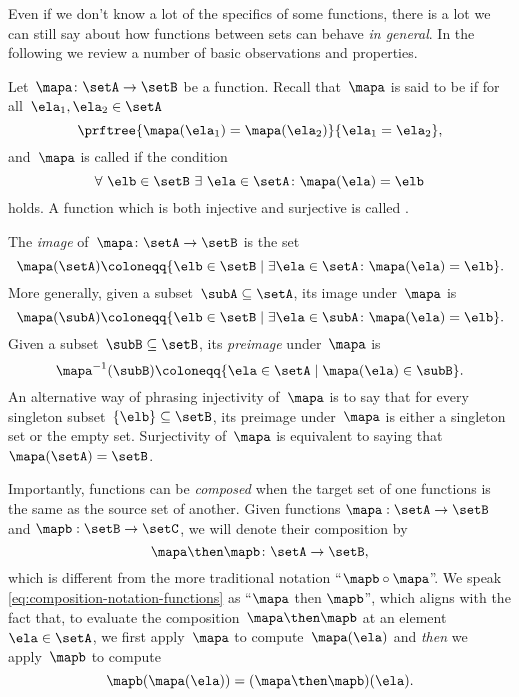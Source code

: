Even if we don't know a lot of the specifics of some functions, there is a lot we can still say about how functions between sets can behave \emph{in general}.
In the following we review a number of basic observations and properties.

Let~$\mapa\colon \setA \to \setB$ be a function.
Recall that~$\mapa$ is said to be \emph{} if for all~$\ela_1, \ela_2 \in \setA$
\begin{equation}
    \label{eq:injectivity-cond}
    \prftree{\mapa(\ela_1) = \mapa(\ela_2)}{\ela_1 = \ela_2},
\end{equation}
and~$\mapa$ is called \emph{} if the condition
\begin{equation}
    \label{eq:surjectivity-cond}
    \forall \ \elb \in \setB \ \exists \ \ela \in \setA \colon \mapa(\ela) = \elb
\end{equation}
holds.
A function which is both injective and surjective is called \emph{}.

The \emph{image} of~$\mapa\colon \setA \to \setB$ is the set
\begin{equation}
    \mapa(\setA) \coloneqq \{ \elb \in \setB \mid \exists \ela \in \setA \colon \mapa(\ela) = \elb \}.
\end{equation}
More generally, given a subset~$\subA \subseteq \setA$, its image under~$\mapa$ is
\begin{equation*}
    \mapa(\subA) \coloneqq \{ \elb \in \setB \mid \exists \ela \in \subA \colon \mapa(\ela) = \elb \}.
\end{equation*}
Given a subset~$\subB \subseteq \setB$, its \emph{preimage} under~$\mapa$ is
\begin{equation*}
    \mapa^{-1}(\subB) \coloneqq \{ \ela \in \setA \mid  \mapa(\ela) \in \subB \}.
\end{equation*}
An alternative way of phrasing injectivity of~$\mapa$ is to say that for every singleton subset~$\{ \elb \} \subseteq \setB$, its preimage under~$\mapa$ is either a singleton set or the empty set.
Surjectivity of~$\mapa$ is equivalent to saying that~$\mapa(\setA) = \setB$.

Importantly, functions can be \emph{composed} when the target set of one functions is the same as the source set of another.
Given functions $\mapa: \setA \to \setB$ and $\mapb : \setB \to \setC$, we will denote their composition by
\begin{equation}
    \label{eq:composition-notation-functions}
    \mapa \then \mapb \colon \setA \to \setB,
\end{equation}
which is different from the more traditional notation ``$\mapb \circ \mapa$''.
We speak \cref{eq:composition-notation-functions} as ``$\mapa$ then $\mapb$'', which aligns with the fact that, to evaluate the composition~$\mapa \then \mapb$ at an element~$\ela \in \setA$, we first apply~$\mapa$ to compute~$\mapa(\ela)$ and \emph{then} we apply~$\mapb$ to compute
\begin{equation*}
    \mapb(\mapa(\ela))=(\mapa \then \mapb)(\ela).
\end{equation*}

